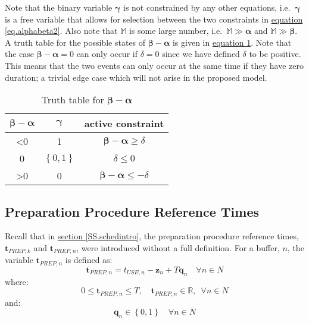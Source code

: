 Note that the binary variable $\boldsymbol{\gamma}$ is not constrained by any
other equations, i.e.\ $\boldsymbol{\gamma}$ is a free variable that allows for
selection between the two constraints in
\hyperref[eq.alphabeta2]{equation \ref*{eq.alphabeta2}}.
Also note that $\mathbb{M}$ is some large number, i.e.\
$\mathbb{M} \gg \boldsymbol{\alpha}$ and $\mathbb{M} \gg \boldsymbol{\beta}$.
A truth table for the possible states of 
$\boldsymbol{\beta} - \boldsymbol{\alpha}$ is given in
\hyperref[tbl.truthalphabeta]{equation \ref*{tbl.truthalphabeta}}.
Note that the case $\boldsymbol{\beta} - \boldsymbol{\alpha} = 0$ can only
occur if $\delta = 0$ since we have defined $\delta$ to be positive.
This means that the two events can only occur at the same time if they have
zero duration; a trivial edge case which will not arise in the proposed model.
\begin{table}[h!]
    \centering
    \caption{Truth table for $\boldsymbol{\beta} - \boldsymbol{\alpha}$}
    \label{tbl.truthalphabeta}
    \begin{tabular}{c c | c}
        $\boldsymbol{\beta} - \boldsymbol{\alpha}$ & $\boldsymbol{\gamma}$ &
        active constraint\\ \hline
        <0 & 1 & $\boldsymbol{\beta} - \boldsymbol{\alpha} \ge \delta$\\
        0 & $\left\{ 0,1 \right\}$ & $\delta \le 0$\\
        >0 & 0 & $\boldsymbol{\beta} - \boldsymbol{\alpha} \le -\delta$\\
    \end{tabular}
\end{table}

\subsection{Preparation Procedure Reference Times}\label{SS.prepreftimes}
Recall that in \hyperref[SS.schedintro]{section \ref*{SS.schedintro}},
the preparation procedure reference times, 
$\boldsymbol{t}_{\mathit{PREP},k}$ and $\boldsymbol{t}_{\mathit{PREP},n}$, were
introduced without a full definition.
For a buffer, $n$, the variable $\boldsymbol{t}_{\mathit{PREP},n}$ is defined
as:
\begin{equation}
    \boldsymbol{t}_{\mathit{PREP},n} = t_{\mathit{USE},n} - \boldsymbol{z}_{n}
    + T \boldsymbol{q}_{n} \quad \forall n \in N
    \label{eq.preptime}
\end{equation}
where:
\begin{equation}
    0 \le \boldsymbol{t}_{\mathit{PREP},n} \le T, \quad 
    \boldsymbol{t}_{\mathit{PREP},n} \in \mathbb{R}, \enspace \forall n \in N
    \label{eq.tprep}
\end{equation}
and:
\begin{equation}
    \boldsymbol{q}_{n} \in \left\{0, 1\right\} \quad \forall n \in N
    \label{eq.q}
\end{equation}

